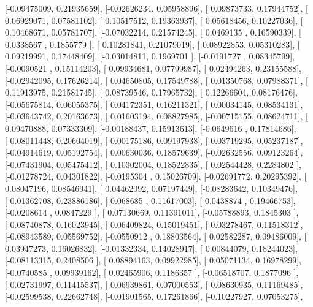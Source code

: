 \documentclass{article}
\begin{document}
       [-0.09475009,  0.21935659],
       [-0.02626234,  0.05958896],
       [ 0.09873733,  0.17944752],
       [ 0.06929071,  0.07581102],
       [ 0.10517512,  0.19363937],
       [ 0.05618456,  0.10227036],
       [ 0.10468671,  0.05781707],
       [-0.07032214,  0.21574245],
       [ 0.0469135 ,  0.16590339],
       [ 0.0338567 ,  0.1855779 ],
       [ 0.10281841,  0.21079019],
       [ 0.08922853,  0.05310283],
       [ 0.09219991,  0.17448409],
       [-0.03014811,  0.1969701 ],
       [-0.0191727 ,  0.08345799],
       [-0.0090521 ,  0.15114203],
       [ 0.09934681,  0.07799987],
       [ 0.02494263,  0.23155588],
       [-0.02942095,  0.17626214],
       [ 0.04650805,  0.17549788],
       [ 0.01350768,  0.07988371],
       [ 0.11913975,  0.21581745],
       [ 0.08739546,  0.17965732],
       [ 0.12266604,  0.08176476],
       [-0.05675814,  0.06055375],
       [ 0.04172351,  0.16211321],
       [ 0.00034145,  0.08534131],
       [-0.03643742,  0.20163673],
       [ 0.01603194,  0.08827985],
       [-0.00715155,  0.08624711],
       [ 0.09470888,  0.07333309],
       [-0.00188437,  0.15913613],
       [-0.0649616 ,  0.17814686],
       [-0.08011448,  0.20604019],
       [ 0.00175186,  0.09197938],
       [-0.03719295,  0.05237187],
       [-0.04914619,  0.05192754],
       [ 0.00630036,  0.18579639],
       [-0.02632556,  0.09123264],
       [-0.07431904,  0.05475412],
       [ 0.10302004,  0.18522835],
       [ 0.02544428,  0.2284802 ],
       [-0.01278724,  0.04301822],
       [-0.0195304 ,  0.15026709],
       [-0.02691772,  0.20295392],
       [ 0.08047196,  0.08546941],
       [ 0.04462092,  0.07197449],
       [-0.08283642,  0.10349476],
       [-0.01362708,  0.23886186],
       [-0.068685  ,  0.11617003],
       [-0.0438874 ,  0.19466753],
       [-0.0208614 ,  0.0847229 ],
       [ 0.07130669,  0.11391011],
       [-0.05788893,  0.1845303 ],
       [-0.08740878,  0.16023945],
       [ 0.06409824,  0.15019451],
       [-0.03278467,  0.11518312],
       [-0.08943589,  0.05569752],
       [-0.0550912 ,  0.18803564],
       [ 0.02582287,  0.09486009],
       [ 0.03947273,  0.16026832],
       [-0.01332334,  0.14028917],
       [ 0.00844079,  0.18244023],
       [-0.08113315,  0.2408506 ],
       [ 0.08894163,  0.09922985],
       [ 0.05071134,  0.16978299],
       [-0.0740585 ,  0.09939162],
       [ 0.02465906,  0.1186357 ],
       [-0.06518707,  0.1877096 ],
       [-0.02731997,  0.11415537],
       [ 0.06939861,  0.07000553],
       [-0.08630935,  0.11169485],
       [-0.02599538,  0.22662748],
       [-0.01901565,  0.17261866],
       [-0.10227927,  0.07053275],
\end{document}
